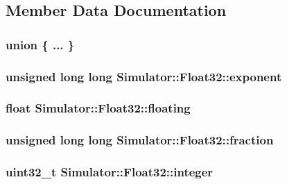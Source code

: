 \subsection{Member Data Documentation}
\hypertarget{struct_simulator_1_1_float32_ad319d98f86b161d69622713bf2c9a946}{\subsubsection[{"@64}]{\setlength{\rightskip}{0pt plus 5cm}union \{ ... \} }}\label{struct_simulator_1_1_float32_ad319d98f86b161d69622713bf2c9a946}
\hypertarget{struct_simulator_1_1_float32_a08b7aed86fa9a607dd2afaa429f9c59b}{
\subsubsection[{exponent}]{\setlength{\rightskip}{0pt plus 5cm}unsigned long long Simulator\+::\+Float32\+::exponent}}\label{struct_simulator_1_1_float32_a08b7aed86fa9a607dd2afaa429f9c59b}
\hypertarget{struct_simulator_1_1_float32_a39b69e226a506e5149ec6cbfbcb21b6c}{
\subsubsection[{floating}]{\setlength{\rightskip}{0pt plus 5cm}float Simulator\+::\+Float32\+::floating}}\label{struct_simulator_1_1_float32_a39b69e226a506e5149ec6cbfbcb21b6c}
\hypertarget{struct_simulator_1_1_float32_a208abec59956bdaeb90fb70c5ec95a7c}{
\subsubsection[{fraction}]{\setlength{\rightskip}{0pt plus 5cm}unsigned long long Simulator\+::\+Float32\+::fraction}}\label{struct_simulator_1_1_float32_a208abec59956bdaeb90fb70c5ec95a7c}
\hypertarget{struct_simulator_1_1_float32_a4592d2c05594f4cf9e3ad621c4c702bb}{
\subsubsection[{integer}]{\setlength{\rightskip}{0pt plus 5cm}uint32\+\_\+t Simulator\+::\+Float32\+::integer}}\label{struct_simulator_1_1_float32_a4592d2c05594f4cf9e3ad621c4c702bb}
